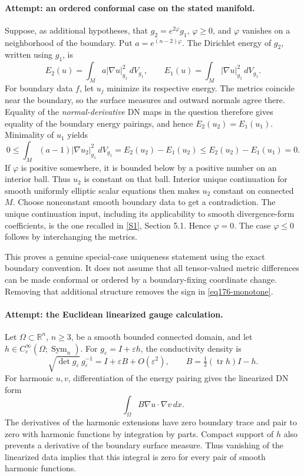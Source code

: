 \documentclass[11pt,a4paper]{article}
\newcommand{\R}{\mathbb{R}}
\newcommand{\eps}{\varepsilon}
\newcommand{\sref}[2]{\hyperlink{source:#1:#2}{[S#2]}}
\numberwithin{equation}{section}
\begin{document}
\paragraph{Attempt: an ordered conformal case on the stated manifold.}
Suppose, as additional hypotheses, that
$g_2=e^{2\varphi}g_1$, $\varphi\ge0$, and $\varphi$ vanishes on a
neighborhood of the boundary. Put $a=e^{(n-2)\varphi}$.
The Dirichlet energy of $g_2$, written using $g_1$, is
\[
 E_2(u)=\int_M a|\nabla u|_{g_1}^2\,dV_{g_1},
 \qquad E_1(u)=\int_M|\nabla u|_{g_1}^2\,dV_{g_1}.
\]
For boundary data $f$, let $u_j$ minimize its respective energy. The metrics
coincide near the boundary, so the surface measures and outward normals
agree there. Equality of the \emph{normal-derivative} DN maps in the question
therefore gives equality of the boundary energy pairings, and hence
$E_2(u_2)=E_1(u_1)$. Minimality of $u_1$ yields
\begin{equation}\label{eq176-monotone}
 0\le\int_M(a-1)|\nabla u_2|_{g_1}^2\,dV_{g_1}
     =E_2(u_2)-E_1(u_2)
     \le E_2(u_2)-E_1(u_1)=0.
\end{equation}
If $\varphi$ is positive somewhere, it is bounded below by a positive
number on an interior ball. Thus $u_2$ is constant on that ball. Interior
unique continuation for smooth uniformly elliptic scalar equations then
makes $u_2$ constant on connected $M$. Choose nonconstant smooth boundary
data to get a contradiction. The unique continuation input, including its
applicability to smooth divergence-form coefficients, is the one recalled
in \sref{176}{1}, Section 5.1. Hence $\varphi=0$.
The case $\varphi\le0$ follows by interchanging the metrics.

This proves a genuine special-case uniqueness statement using the exact
boundary convention. It does not assume that all tensor-valued metric
differences can be made conformal or ordered by a boundary-fixing
coordinate change. Removing that additional structure removes the sign
in \eqref{eq176-monotone}.

\paragraph{Attempt: the Euclidean linearized gauge calculation.}
Let $\Omega\subset\R^n$, $n\ge3$, be a smooth bounded connected domain,
and let $h\in C_c^\infty(\Omega;\operatorname{Sym}_n)$.
For $g_\eps=I+\eps h$, the conductivity density is
\begin{equation}\label{eq176-density}
 \sqrt{\det g_\eps}\,g_\eps^{-1}
   =I+\eps B+O(\eps^2),\qquad
 B=\tfrac12(\operatorname{tr}h)I-h.
\end{equation}
For harmonic $u,v$, differentiation of the energy pairing gives the
linearized DN form
\[
                       \int_\Omega B\nabla u\cdot\nabla v\,dx.
\]
The derivatives of the harmonic extensions have zero boundary trace and
pair to zero with harmonic functions by integration by parts. Compact
support of $h$ also prevents a derivative of the boundary surface measure.
Thus vanishing of the linearized data implies that this integral is zero
for every pair of smooth harmonic functions.
\end{document}

